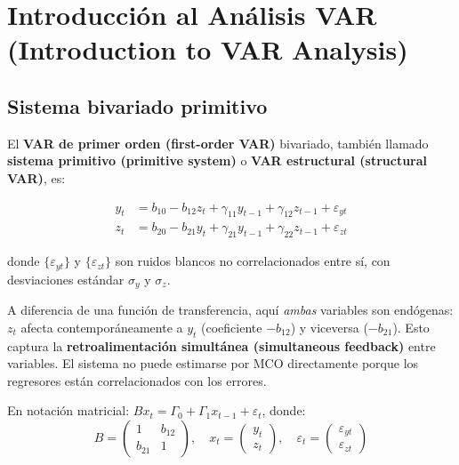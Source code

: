 \documentclass[12pt]{article}
\begin{document}
\section{Introducci\'on al An\'alisis VAR (Introduction to VAR Analysis)}

\subsection{Sistema bivariado primitivo}

El \textbf{VAR de primer orden (first-order VAR)} bivariado, tambi\'en llamado \textbf{sistema primitivo (primitive system)} o \textbf{VAR estructural (structural VAR)}, es:

\begin{align}
y_t &= b_{10} - b_{12}z_t + \gamma_{11}y_{t-1} + \gamma_{12}z_{t-1} + \varepsilon_{yt} \label{eq:prim1}\\
z_t &= b_{20} - b_{21}y_t + \gamma_{21}y_{t-1} + \gamma_{22}z_{t-1} + \varepsilon_{zt} \label{eq:prim2}
\end{align}

donde $\{\varepsilon_{yt}\}$ y $\{\varepsilon_{zt}\}$ son ruidos blancos no correlacionados entre s\'i, con desviaciones est\'andar $\sigma_y$ y $\sigma_z$.

\begin{intuicionmat}
A diferencia de una funci\'on de transferencia, aqu\'i \textit{ambas} variables son end\'ogenas: $z_t$ afecta contempor\'aneamente a $y_t$ (coeficiente $-b_{12}$) y viceversa ($-b_{21}$). Esto captura la \textbf{retroalimentaci\'on simult\'anea (simultaneous feedback)} entre variables. El sistema no puede estimarse por MCO directamente porque los regresores est\'an correlacionados con los errores.
\end{intuicionmat}

En notaci\'on matricial: $Bx_t = \Gamma_0 + \Gamma_1 x_{t-1} + \varepsilon_t$, donde:
\[
B = \begin{pmatrix} 1 & b_{12} \\ b_{21} & 1 \end{pmatrix}, \quad x_t = \begin{pmatrix} y_t \\ z_t \end{pmatrix}, \quad \varepsilon_t = \begin{pmatrix} \varepsilon_{yt} \\ \varepsilon_{zt} \end{pmatrix}
\]
\end{document}
